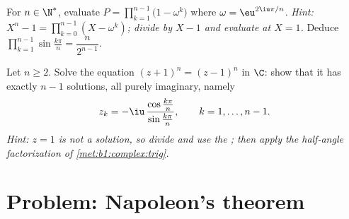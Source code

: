 \begin{exercise}[$\star\star\star$]\label{exo:b1:complex:11}
For $n \in \N^*$, evaluate $P = \prod_{k=1}^{n-1}
\bigl(1 - \omega^k\bigr)$ where $\omega = \eu^{2\iu\pi/n}$.
\emph{Hint: $X^n - 1 = \prod_{k=0}^{n-1} (X - \omega^k)$; divide by
$X - 1$ and evaluate at $X = 1$.} Deduce
$\prod_{k=1}^{n-1} \sin\frac{k\pi}{n} = \dfrac{n}{2^{n-1}}$.
\end{exercise}

\begin{exercise}[$\star\star$]\label{exo:b1:complex:12}
Let $n \geq 2$. Solve the equation $(z + 1)^n = (z - 1)^n$ in $\C$:
show that it has exactly $n - 1$ solutions, all purely imaginary,
namely
\[
z_k = -\iu\,\frac{\cos\frac{k\pi}{n}}{\sin\frac{k\pi}{n}},
\qquad k = 1, \dots, n - 1 .
\]
\emph{Hint: $z = 1$ is not a solution, so divide and use the ; then apply the half-angle factorization of
\cref{met:b1:complex:trig}.}
\end{exercise}

\section{Problem: Napoleon's theorem}

